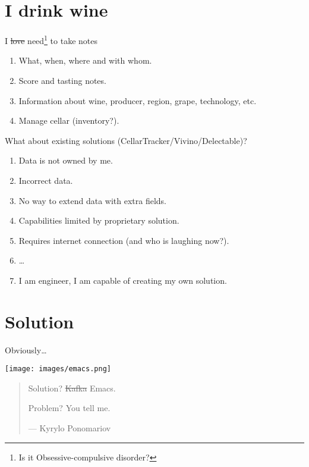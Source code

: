 \documentclass[presentation,aspectratio=169,smaller]{beamer}
\begin{document}
\section{I drink wine}
\label{sec:org6f5a0c8}

\begin{frame}[label={sec:org8fe2b30}]{I \sout{love} need\footnote{Is it Obsessive-compulsive disorder?} to take notes}
\begin{enumerate}
\item What, when, where and with whom.
\item Score and tasting notes.
\item Information about wine, producer, region, grape, technology, etc.
\item Manage cellar (inventory?).
\end{enumerate}
\end{frame}

\begin{frame}[label={sec:org8f98e2a}]{What about existing solutions (CellarTracker/Vivino/Delectable)?}
\begin{enumerate}
\item Data is not owned by me.
\item Incorrect data.
\item No way to extend data with extra fields.
\item Capabilities limited by proprietary solution.
\item Requires internet connection (and who is laughing now?).
\item \ldots{}
\item I am engineer, I am capable of creating my own solution.
\end{enumerate}
\end{frame}

\section{Solution}
\label{sec:org4a75de6}

\begin{frame}[label={sec:orgcb72f42}]{Obviously\ldots{}}
\begin{center}
\texttt{[image: images/emacs.png]}
\end{center}

\begin{quote}
Solution? \sout{Kafka} Emacs.

Problem? You tell me.

--- Kyrylo Ponomariov
\end{quote}
\end{frame}
\end{document}
